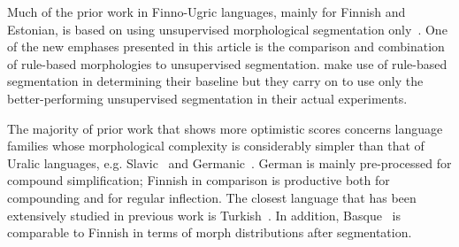 \documentclass[free]{flammie}
\begin{document}
Much of the prior work in Finno-Ugric languages, mainly for Finnish and Estonian, is based on using unsupervised morphological segmentation only~\cite{virpioja2007morphology,fishel2010linguistically,clifton2011combining,luong2010hybrid,degispert2009minimum}.
One of the new emphases presented in this article is the comparison and combination of rule-based morphologies to unsupervised segmentation.
\cite{clifton2011combining} make use of rule-based segmentation in determining their baseline but they carry on to use only the better-performing unsupervised segmentation in their actual experiments.


The majority of prior work that shows more optimistic scores concerns language families whose morphological complexity is considerably simpler than that of Uralic languages, e.g. Slavic~\cite{popovic2004towards} and Germanic~\cite{cap2014produce}.
German is mainly pre-processed for compound simplification; Finnish in comparison is productive both for compounding and for regular inflection.
The closest language that has been extensively studied in previous work is Turkish~\cite{oflazer2007exploring,mermer2010unsupervised}.
In addition, Basque~\cite{deilarraza2009relevance} is comparable to Finnish in terms of morph distributions after segmentation.
\end{document}
